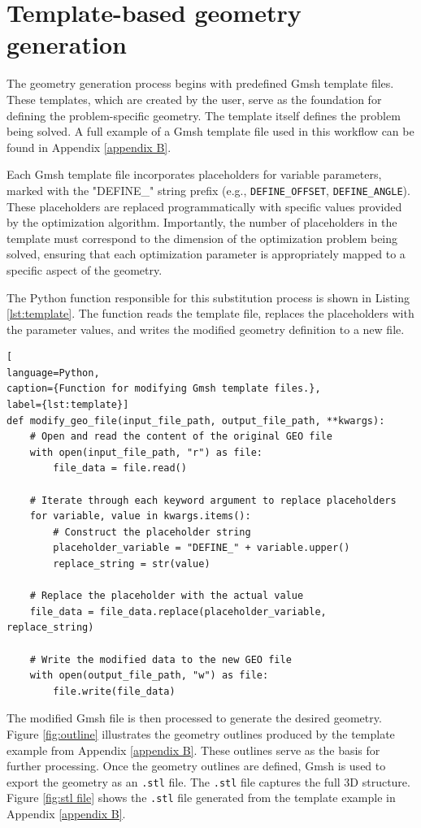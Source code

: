 \section{Template-based geometry generation}

The geometry generation process begins with predefined Gmsh template files. These templates, which are created by the user, serve as the foundation for defining the problem-specific geometry. The template itself defines the problem being solved. 
A full example of a Gmsh template file used in this workflow can be found in Appendix \ref{appendix B}.

Each Gmsh template file incorporates placeholders for variable parameters, marked with the "DEFINE\_" string prefix (e.g., \texttt{DEFINE\_OFFSET}, \texttt{DEFINE\_ANGLE}). These placeholders are replaced programmatically with specific values provided by the optimization algorithm. Importantly, the number of placeholders in the template must correspond to the dimension of the optimization problem being solved, ensuring that each optimization parameter is appropriately mapped to a specific aspect of the geometry.

The Python function responsible for this substitution process is shown in Listing \ref{lst:template}. The function reads the template file, replaces the placeholders with the parameter values, and writes the modified geometry definition to a new file.

\newpage
\begin{lstlisting}[
language=Python,
caption={Function for modifying Gmsh template files.},
label={lst:template}]
def modify_geo_file(input_file_path, output_file_path, **kwargs):	
	# Open and read the content of the original GEO file
	with open(input_file_path, "r") as file:
		file_data = file.read()
	
	# Iterate through each keyword argument to replace placeholders
	for variable, value in kwargs.items():
		# Construct the placeholder string
		placeholder_variable = "DEFINE_" + variable.upper()
		replace_string = str(value)
	
	# Replace the placeholder with the actual value
	file_data = file_data.replace(placeholder_variable, replace_string)
	
	# Write the modified data to the new GEO file
	with open(output_file_path, "w") as file:
		file.write(file_data)
\end{lstlisting}

The modified Gmsh file is then processed to generate the desired geometry. Figure \ref{fig:outline} illustrates the geometry outlines produced by the template example from Appendix \ref{appendix B}. These outlines serve as the basis for further processing. Once the geometry outlines are defined, Gmsh is used to export the geometry as an \texttt{.stl} file. The \texttt{.stl} file captures the full 3D structure. Figure \ref{fig:stl file} shows the \texttt{.stl} file generated from the template example in Appendix \ref{appendix B}.


